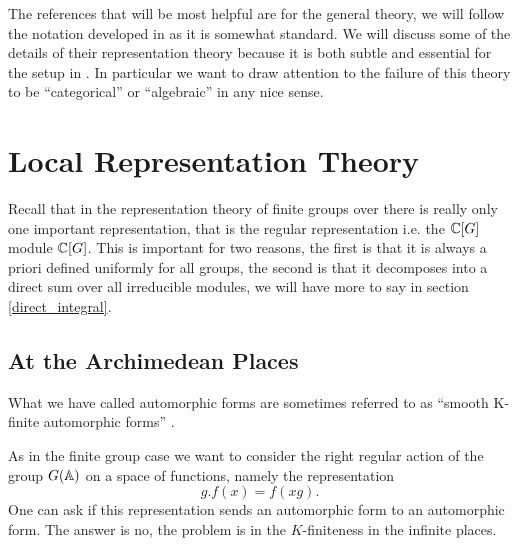 The references that will be most helpful are \cite[I.II]{borelAutomorphicFormsRepresentations1979}\cite{getzIntroductionAutomorphicRepresentations2024} for the general theory, we will follow the notation developed in \cite{moeglinSpectralDecompositionEisenstein1995} as it is somewhat standard. We will discuss some of the details of their representation theory because it is both subtle and essential for the setup in \cite{jiangPolesCertainResidual2013}. In particular we want to draw attention to the failure of this theory to be ``categorical'' or ``algebraic'' in any nice sense. 
\section{Local Representation Theory}
Recall that in the representation theory of finite groups over \C there is really only one important representation, that is the regular representation i.e. the \(\C[G]\) module \(\C[G]\). This is important for two reasons, the first is that it is always a priori defined uniformly for all groups, the second is that it decomposes into a direct sum over all irreducible modules, we will have more to say in section \ref{direct_integral}.

\subsection{At the Archimedean Places}

\begin{remark}
    What we have called automorphic forms are sometimes referred to as ``smooth K-finite automorphic forms'' \cite[2.2]{cogdellLecturesLfunctionsConverse}.
\end{remark}
As in the finite group case we want to consider the right regular action of the group \(G(\A)\) on a space of functions, namely the representation 
\[g.f(x) = f(xg).\]
One can ask if this representation sends an automorphic form to an automorphic form. The answer is no, the problem is in the \(K\)-finiteness in the infinite places.

